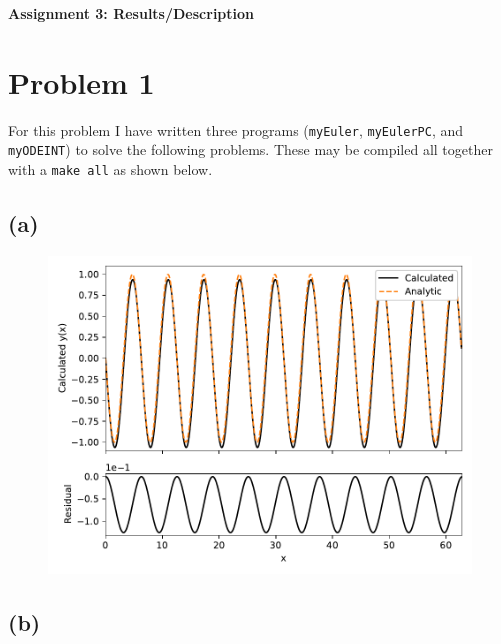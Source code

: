 \documentclass[12pt]{article}
\begin{document}
\begin{center}\begin{LARGE}
\textbf{Assignment 3: Results/Description}
\end{LARGE}\end{center}

\section*{Problem 1}

For this problem I have written three programs (\texttt{myEuler},
\texttt{myEulerPC}, and \texttt{myODEINT}) to solve the following problems.
These may be compiled all together with a \texttt{make all} as shown below.


\subsection*{(a)}

\begin{figure}[H]
    \centering
    \includegraphics[scale=1]{euler}
    \label{fig:euler}
\end{figure}

\subsection*{(b)}
\end{document}

